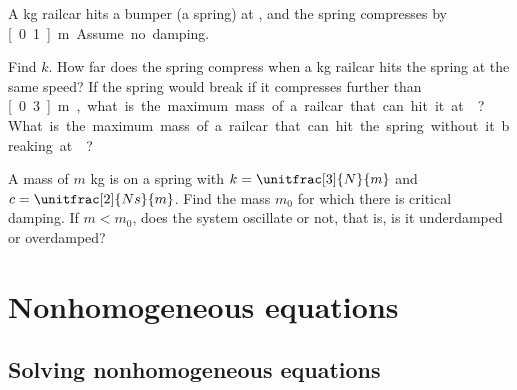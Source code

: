 \begin{exercise}
\pagebreak[2]
A \unit[5000]{kg} railcar hits a bumper (a spring) at ,
and the spring compresses by \unit[0.1]{m}.  Assume no damping.
\begin{tasks}
\task Find $k$.
\task How far does the spring compress when a
\unit[10000]{kg} railcar hits the spring at the same speed?
\task If the spring
would break if it compresses further than \unit[0.3]{m}, what is the maximum
mass of a railcar that can hit it at ?
\task What is
the maximum mass of a railcar that can hit the spring without it breaking
at ?
\end{tasks}
\end{exercise}

\begin{exercise}
A mass of $m$ \unit{kg} is on a spring with $k=\unitfrac[3]{N}{m}$ and
$c=\unitfrac[2]{Ns}{m}$.  Find the mass $m_0$ for which there is critical
damping.  If $m < m_0$, does the system oscillate or not, that is, is it
underdamped or overdamped?
\end{exercise}


\sectionnewpage
\section{Nonhomogeneous equations}
\label{sec:nonhom}



\subsection{Solving nonhomogeneous equations}


